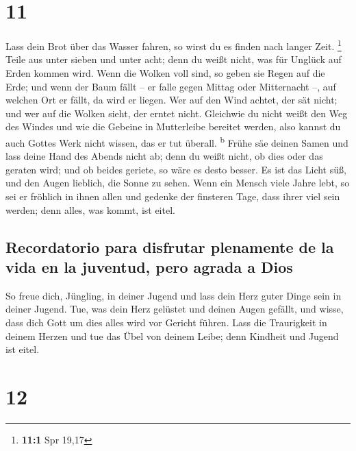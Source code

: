 \hypertarget{section-10}{%
\section{11}\label{section-10}}

 Lass dein Brot über das Wasser fahren, so wirst du es
finden nach langer Zeit. \footnote{\textbf{11:1} Spr 19,17}
 Teile aus unter sieben und unter acht; denn du weißt
nicht, was für Unglück auf Erden kommen wird.  Wenn die
Wolken voll sind, so geben sie Regen auf die Erde; und wenn der Baum
fällt -- er falle gegen Mittag oder Mitternacht --, auf welchen Ort er
fällt, da wird er liegen.  Wer auf den Wind achtet, der
sät nicht; und wer auf die Wolken sieht, der erntet nicht.
 Gleichwie du nicht weißt den Weg des Windes und wie die
Gebeine in Mutterleibe bereitet werden, also kannst du auch Gottes Werk
nicht wissen, das er tut überall. \textsuperscript{b} 
Frühe säe deinen Samen und lass deine Hand des Abends nicht ab; denn du
weißt nicht, ob dies oder das geraten wird; und ob beides geriete, so
wäre es desto besser.  Es ist das Licht süß, und den Augen
lieblich, die Sonne zu sehen.  Wenn ein Mensch viele Jahre
lebt, so sei er fröhlich in ihnen allen und gedenke der finsteren Tage,
dass ihrer viel sein werden; denn alles, was kommt, ist eitel.

\hypertarget{recordatorio-para-disfrutar-plenamente-de-la-vida-en-la-juventud-pero-agrada-a-dios}{%
\subsection{Recordatorio para disfrutar plenamente de la vida en la
juventud, pero agrada a
Dios}\label{recordatorio-para-disfrutar-plenamente-de-la-vida-en-la-juventud-pero-agrada-a-dios}}

 So freue dich, Jüngling, in deiner Jugend und lass dein
Herz guter Dinge sein in deiner Jugend. Tue, was dein Herz gelüstet und
deinen Augen gefällt, und wisse, dass dich Gott um dies alles wird vor
Gericht führen.  Lass die Traurigkeit in deinem Herzen
und tue das Übel von deinem Leibe; denn Kindheit und Jugend ist eitel.

\hypertarget{section-11}{%
\section{12}\label{section-11}}

